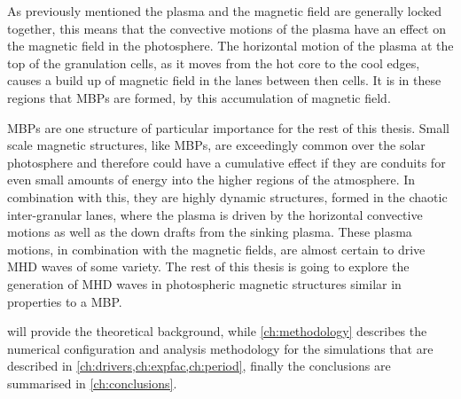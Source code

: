 As previously mentioned the plasma and the magnetic field are generally locked together, this means that the convective motions of the plasma have an effect on the magnetic field in the photosphere.
The horizontal motion of the plasma at the top of the granulation cells, as it moves from the hot core to the cool edges, causes a build up of magnetic field in the lanes between then cells.
It is in these regions that MBPs are formed, by this accumulation of magnetic field.

MBPs are one structure of particular importance for the rest of this thesis.
Small scale magnetic structures, like MBPs, are exceedingly common over the solar photosphere and therefore could have a cumulative effect if they are conduits for even small amounts of energy into the higher regions of the atmosphere.
In combination with this, they are highly dynamic structures, formed in the chaotic inter-granular lanes, where the plasma is driven by the horizontal convective motions as well as the down drafts from the sinking plasma.
These plasma motions, in combination with the magnetic fields, are almost certain to drive MHD waves of some variety. 
The rest of this thesis is going to explore the generation of MHD waves in photospheric magnetic structures similar in properties to a MBP.

 will provide the theoretical background, while \cref{ch:methodology} describes the numerical configuration and analysis methodology for the simulations that are described in \cref{ch:drivers,ch:expfac,ch:period}, finally the conclusions are summarised in \cref{ch:conclusions}.
